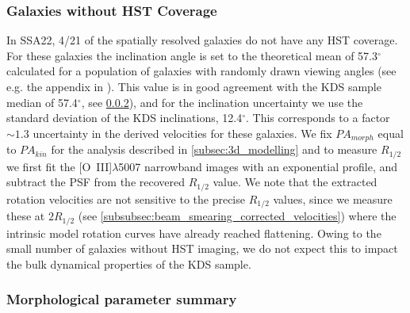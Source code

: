 \documentclass[fleqn,usenatbib]{mn2e}
\begin{document}
\subsubsection{Galaxies without HST Coverage}\label{subsubsection:lack_of_hst}
In SSA22, 4/21 of the spatially resolved galaxies do not have any HST coverage.
For these galaxies the inclination angle is set to the theoretical mean of 57.3$^{\circ}$ calculated for a population of galaxies with randomly drawn viewing angles (see e.g. the appendix in \cite{Law2009}).
This value is in good agreement with the KDS sample median of 57.4$^{\circ}$, see \cref{subsubsection:morph_param_summary}), and for the inclination uncertainty we use the standard deviation of the KDS inclinations, 12.4$^{\circ}$.
This corresponds to a factor $\sim1.3$ uncertainty in the derived velocities for these galaxies.
We fix $PA_{morph}$ equal to $PA_{kin}$ for the analysis described in \cref{subsec:3d_modelling} and to measure $R_{1/2}$ we first fit the [O~{\sc III}]$\lambda$5007 narrowband images with an exponential profile, and subtract the PSF from the recovered $R_{1/2}$ value.
We note that the extracted rotation velocities are not sensitive to the precise $R_{1/2}$ values, since we measure these at $2R_{1/2}$ (see \cref{subsubsec:beam_smearing_corrected_velocities}) where the intrinsic model rotation curves have already reached flattening.
Owing to the small number of galaxies without HST imaging, we do not expect this to impact the bulk dynamical properties of the KDS sample.

\subsubsection{Morphological parameter summary}\label{subsubsection:morph_param_summary}
\end{document}
